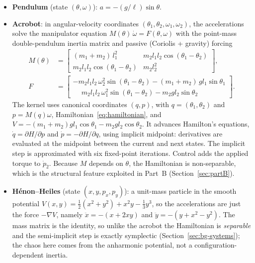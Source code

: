 \documentclass[11pt]{article}
\begin{document}
\begin{itemize}
\item \textbf{Pendulum} (state $(\theta,\omega)$): $a = -(g/\ell)\sin\theta$.
\item \textbf{Acrobot}: in angular-velocity coordinates $(\theta_1,\theta_2,\omega_1,\omega_2)$, the accelerations
solve the manipulator equation $M(\theta)\,\dot\omega = F(\theta,\omega)$ with the point-mass
double-pendulum inertia matrix and passive (Coriolis + gravity) forcing
\begin{equation}
\begin{aligned}
M(\theta)&=\begin{bmatrix} (m_1+m_2)\,l_1^2 & m_2 l_1 l_2 \cos(\theta_1-\theta_2)\\[2pt]
m_2 l_1 l_2 \cos(\theta_1-\theta_2) & m_2 l_2^2 \end{bmatrix},\\
F&=\begin{bmatrix} -m_2 l_1 l_2\,\omega_2^2 \sin(\theta_1-\theta_2) - (m_1+m_2)\,g l_1 \sin\theta_1\\[2pt]
\phantom{-}m_2 l_1 l_2\,\omega_1^2 \sin(\theta_1-\theta_2) - m_2 g l_2 \sin\theta_2 \end{bmatrix}.
\end{aligned}
\label{eq:acrobot-massmatrix}
\end{equation}
The kernel uses canonical coordinates $(q,p)$, with $q=(\theta_1,\theta_2)$ and
$p=M(q)\omega$, Hamiltonian~\eqref{eq:hamiltonian}, and
$V=-(m_1+m_2)gl_1\cos\theta_1-m_2gl_2\cos\theta_2$.
It advances Hamilton's equations, $\dot q=\partial H/\partial p$ and
$\dot p=-\partial H/\partial q$, using implicit midpoint: derivatives are evaluated
at the midpoint between the current and next states. The implicit step is approximated
with six fixed-point iterations. Control adds the applied torque to $\dot p_2$. Because $M$ depends on $\theta$, the Hamiltonian is
non-separable, which is the structural feature exploited in Part~B (Section~\ref{sec:partB}).
\item \textbf{Hénon--Heiles} (state $(x,y,p_x,p_y)$): a unit-mass particle in the smooth potential
$V(x,y)=\tfrac12(x^2+y^2)+x^2y-\tfrac13 y^3$, so the accelerations are just the force $-\nabla V$,
namely $\ddot x = -(x+2xy)$ and $\ddot y = -(y+x^2-y^2)$. The mass matrix is the identity, so unlike
the acrobot the Hamiltonian is \emph{separable} and the semi-implicit step is exactly symplectic
(Section~\ref{sec:bg-systems}); the chaos here comes from the anharmonic potential, not a
configuration-dependent inertia.
\end{itemize}
\end{document}
